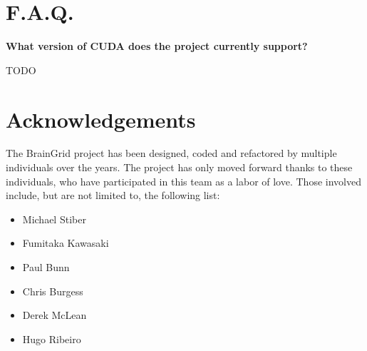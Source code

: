 \documentclass[11pt]{article}
\begin{document}
\section{F.A.Q.}
\bfseries What version of CUDA does the project currently support?

\noindent \mdseries TODO

\noindent \bfseries 

\pagebreak
\section{Acknowledgements}
\mdseries The BrainGrid project has been designed, coded and refactored by multiple individuals over the years. The project has only moved forward thanks to these individuals, who have participated in this team as a labor of love. Those involved include, but are not limited to, the following list:
\begin{itemize}
	\item	Michael Stiber
	\item Fumitaka Kawasaki
	\item Paul Bunn
	\item Chris Burgess
	\item Derek McLean
	\item Hugo Ribeiro
\end{itemize}
\end{document}
